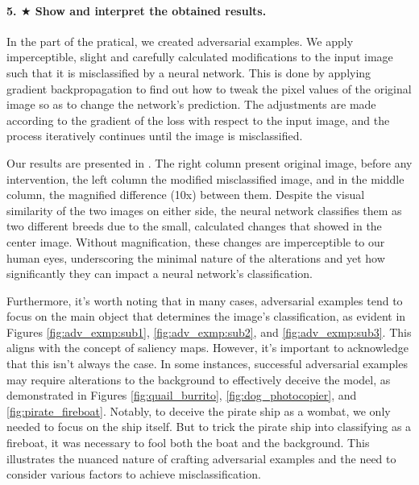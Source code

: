 \paragraph*{5. $ \bigstar $ Show and interpret the obtained results.}

In the part of the pratical, we created adversarial examples. We apply imperceptible, slight and carefully calculated modifications to the input image such that it is misclassified by a neural network. This is done by applying gradient backpropagation to find out how to tweak the pixel values of the original image so as to change the network's prediction. The adjustments are made according to the gradient of the loss with respect to the input image, and the process iteratively continues until the image is misclassified.

Our results are presented in . The right column present original image, before any intervention, the left column the modified misclassified image, and in the middle column, the magnified difference (10x) between them. Despite the visual similarity of the two images on either side, the neural network classifies them as two different breeds due to the small, calculated changes that showed in the center image. Without magnification, these changes are imperceptible to our human eyes, underscoring the minimal nature of the alterations and yet how significantly they can impact a neural network's classification.

Furthermore, it's worth noting that in many cases, adversarial examples tend to focus on the main object that determines the image's classification, as evident in Figures \ref{fig:adv_exmp:sub1}, \ref{fig:adv_exmp:sub2}, and \ref{fig:adv_exmp:sub3}. This aligns with the concept of saliency maps. However, it's important to acknowledge that this isn't always the case. In some instances, successful adversarial examples may require alterations to the background to effectively deceive the model, as demonstrated in Figures \ref{fig:quail_burrito}, \ref{fig:dog_photocopier}, and \ref{fig:pirate_fireboat}. Notably, to deceive the pirate ship as a wombat, we only needed to focus on the ship itself. But to trick the pirate ship into classifying as a fireboat, it was necessary to fool both the boat and the background. This illustrates the nuanced nature of crafting adversarial examples and the need to consider various factors to achieve misclassification.

